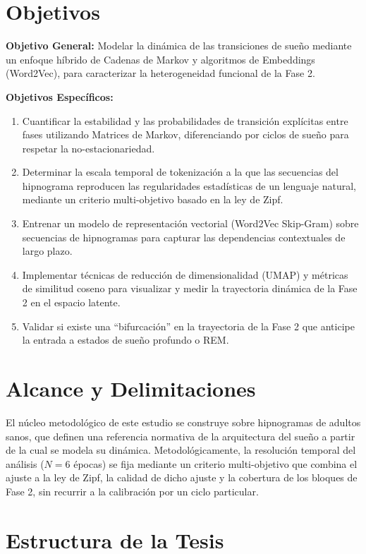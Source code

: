 \section{Objetivos}

\textbf{Objetivo General:}
Modelar la dinámica de las transiciones de sueño mediante un enfoque híbrido de Cadenas de Markov y algoritmos de Embeddings (Word2Vec), para caracterizar la heterogeneidad funcional de la Fase 2.

\textbf{Objetivos Específicos:}
\begin{enumerate}
    \item Cuantificar la estabilidad y las probabilidades de transición explícitas entre fases utilizando Matrices de Markov, diferenciando por ciclos de sueño para respetar la no-estacionariedad.
    \item Determinar la escala temporal de tokenización a la que las secuencias del hipnograma reproducen las regularidades estadísticas de un lenguaje natural, mediante un criterio multi-objetivo basado en la ley de Zipf.
    \item Entrenar un modelo de representación vectorial (Word2Vec Skip-Gram) sobre secuencias de hipnogramas para capturar las dependencias contextuales de largo plazo.
    \item Implementar técnicas de reducción de dimensionalidad (UMAP) y métricas de similitud coseno para visualizar y medir la trayectoria dinámica de la Fase 2 en el espacio latente.
    \item Validar si existe una ``bifurcación'' en la trayectoria de la Fase 2 que anticipe la entrada a estados de sueño profundo o REM.
\end{enumerate}

\section{Alcance y Delimitaciones}

El núcleo metodológico de este estudio se construye sobre hipnogramas de adultos sanos, que definen una referencia normativa de la arquitectura del sueño a partir de la cual se modela su dinámica. Metodológicamente, la resolución temporal del análisis ($N=6$ épocas) se fija mediante un criterio multi-objetivo que combina el ajuste a la ley de Zipf, la calidad de dicho ajuste y la cobertura de los bloques de Fase 2, sin recurrir a la calibración por un ciclo particular.

\FloatBarrier
\section{Estructura de la Tesis}

